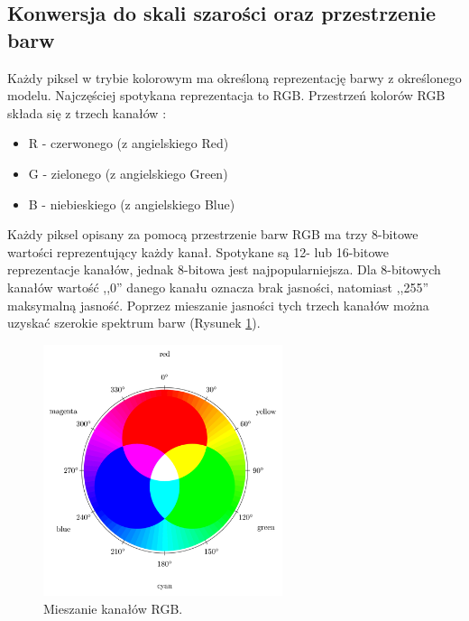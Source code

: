 \documentclass[a4paper,twoside,12pt]{book}
\begin{document}
    \subsection{Konwersja do skali szarości oraz przestrzenie barw}\label{subsec:konwersja-do-skali-szarości-oraz-przestrzenie-barw}
    Każdy piksel w trybie kolorowym ma określoną reprezentację barwy z określonego modelu.
    Najczęściej spotykana
    reprezentacja to RGB. Przestrzeń kolorów RGB składa się z trzech kanałów \cite{kolory}:

    \begin{itemize}
        \item R - czerwonego (z angielskiego Red)
        \item G - zielonego (z angielskiego Green)
        \item B - niebieskiego (z angielskiego Blue)
    \end{itemize}

    Każdy piksel opisany za pomocą przestrzenie barw RGB ma trzy 8-bitowe wartości reprezentujący każdy kanał.
    Spotykane
    są 12- lub 16-bitowe reprezentacje kanałów, jednak 8-bitowa jest najpopularniejsza.
    Dla 8-bitowych kanałów
    wartość ,,0''
    danego kanału oznacza brak jasności, natomiast ,,255'' maksymalną jasność.
    Poprzez mieszanie jasności tych trzech kanałów
    można uzyskać szerokie spektrum barw (Rysunek \ref{fig.mieszanieKolorow}).

    \begin{figure}
        \centering
        \includegraphics[width=7cm]{Obrazy/mieszanieKolorow.jpg}
        \caption{Mieszanie kanałów RGB. \cite{colorMixing}}
        \label{fig.mieszanieKolorow}
    \end{figure}
\end{document}
